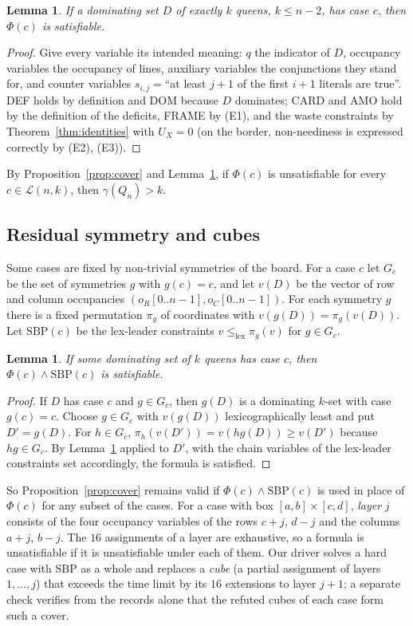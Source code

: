 \documentclass[11pt]{article}
\newtheorem{lemma}[theorem]{Lemma}
\theoremstyle{definition}
\theoremstyle{remark}
\begin{document}
\begin{lemma}\label{lem:sound}
If a dominating set $D$ of exactly $k$ queens, $k\le n-2$, has case $c$, then $\Phi(c)$ is satisfiable.
\end{lemma}
\begin{proof}
Give every variable its intended meaning: $q$ the indicator of $D$, occupancy variables the occupancy
of lines, auxiliary variables the conjunctions they stand for, and counter variables
$s_{i,j}=$``at least $j+1$ of the first $i+1$ literals are true''. DEF holds by definition and DOM because
$D$ dominates; CARD and AMO hold by the definition of the deficits, FRAME by (E1), and the waste
constraints by Theorem~\ref{thm:identities} with $U_X=0$ (on the border, non-neediness is expressed
correctly by (E2), (E3)).
\end{proof}

By Proposition~\ref{prop:cover} and Lemma~\ref{lem:sound}, if $\Phi(c)$ is unsatisfiable for every
$c\in\mathcal L(n,k)$, then $\gamma(Q_n)>k$.

\subsection{Residual symmetry and cubes}

Some cases are fixed by non-trivial symmetries of the board. For a case $c$ let $G_c$ be the set of
symmetries $g$ with $g(c)=c$, and let $v(D)$ be the vector of row and column occupancies
$(o_R[0..n-1],o_C[0..n-1])$. For each symmetry $g$ there is a fixed permutation $\pi_g$ of coordinates with
$v(g(D))=\pi_g(v(D))$. Let $\mathrm{SBP}(c)$ be the lex-leader constraints $v\le_{\mathrm{lex}}\pi_g(v)$ for
$g\in G_c$.

\begin{lemma}\label{lem:R}
If some dominating set of $k$ queens has case $c$, then $\Phi(c)\wedge\mathrm{SBP}(c)$ is satisfiable.
\end{lemma}
\begin{proof}
If $D$ has case $c$ and $g\in G_c$, then $g(D)$ is a dominating $k$-set with case $g(c)=c$. Choose
$g\in G_c$ with $v(g(D))$ lexicographically least and put $D'=g(D)$. For $h\in G_c$,
$\pi_h(v(D'))=v(hg(D))\ge v(D')$ because $hg\in G_c$. By Lemma~\ref{lem:sound} applied to $D'$, with the
chain variables of the lex-leader constraints set accordingly, the formula is satisfied.
\end{proof}

So Proposition~\ref{prop:cover} remains valid if $\Phi(c)\wedge\mathrm{SBP}(c)$ is used in place of
$\Phi(c)$ for any subset of the cases. For a case with box $[a,b]\times[c,d]$, \emph{layer} $j$ consists of
the four occupancy variables of the rows $c+j$, $d-j$ and the columns $a+j$, $b-j$. The $16$ assignments
of a layer are exhaustive, so a formula is unsatisfiable if it is unsatisfiable under each of them. Our
driver solves a hard case with $\mathrm{SBP}$ as a whole and replaces a \emph{cube} (a partial assignment
of layers $1,\dots,j$) that exceeds the time limit by its $16$ extensions to layer $j+1$; a separate check
verifies from the records alone that the refuted cubes of each case form such a cover.
\end{document}
